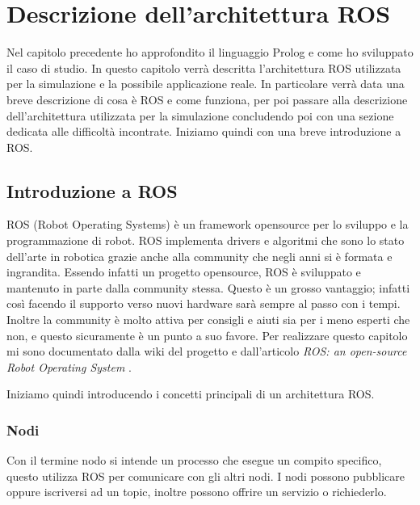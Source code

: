 \clearpage
\newpage
\chapter{Descrizione dell'architettura ROS}
\label{cha:descrizionearchros}
Nel capitolo precedente ho approfondito il linguaggio Prolog e come ho sviluppato il caso di studio. In questo capitolo verrà descritta l'architettura ROS utilizzata per la simulazione e la possibile applicazione reale.
In particolare verrà data una breve descrizione di cosa è ROS e come funziona, per poi passare alla descrizione dell'architettura utilizzata per la simulazione concludendo poi con una sezione dedicata alle difficoltà incontrate. Iniziamo quindi con una breve introduzione a ROS.

\section{Introduzione a ROS}
\label{sec:introduzione_ros}
ROS (Robot Operating Systems) è un framework opensource per lo sviluppo e la programmazione di robot. ROS implementa drivers e algoritmi che sono lo stato dell'arte in robotica grazie anche alla community che negli anni si è formata e ingrandita.
Essendo infatti un progetto opensource, ROS è sviluppato e mantenuto in parte dalla community stessa. Questo è un grosso vantaggio; infatti così facendo il supporto verso nuovi hardware sarà sempre al passo con i tempi. Inoltre la community è molto attiva per consigli e aiuti sia per i meno esperti che non, e questo sicuramente è un punto a suo favore.
Per realizzare questo capitolo mi sono documentato dalla wiki del progetto \cite{rossite} e dall'articolo \textit{ROS: an open-source Robot Operating System} \cite{quingley2009ros}.

Iniziamo quindi introducendo i concetti principali di un architettura ROS.

\subsection{Nodi}
\label{subsec:nodi}
Con il termine nodo si intende un processo che esegue un compito specifico, questo utilizza ROS per comunicare con gli altri nodi. I nodi possono pubblicare oppure iscriversi ad un topic, inoltre possono offrire un servizio o richiederlo. 

